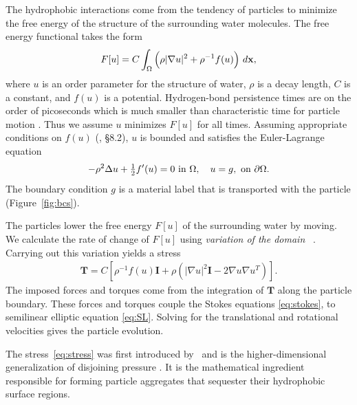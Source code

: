 The hydrophobic interactions come from the tendency of particles to
minimize the free energy of the structure of the surrounding water
molecules. The free energy functional takes the form 
\begin{align*}
\label{eq:free_energy}
  F[u] = C \int_{\Omega} \left(\rho |\nabla u|^2 + \rho^{-1} f(u)\right)
  \,d\mathbf{x},
\end{align*}
where $u$ is an order parameter for the structure of water, $\rho$ is a
decay length, $C$ is a constant, and $f(u)$ is a potential.
Hydrogen-bond persistence times are on the order of picoseconds
which is much smaller than characteristic time for 
particle motion \cite{MaGa13}.
Thus we assume $u$ minimizes $F[u]$ for all times.
Assuming appropriate conditions on $f(u)$ (\cite{evans10}, \S 8.2),
$u$ is bounded and satisfies the Euler-Lagrange equation
\begin{equation}
\label{eq:SL}
-\rho^2 \Delta u + \tfrac{1}{2}f'(u) = 0  \text{ in } \Omega,\quad u = g,
\text{ on } \partial\Omega.
\end{equation}
The boundary condition $g$ is a material label that is transported with
the particle (Figure~\ref{fig:bcs}).

The particles lower the free energy $F[u]$ of the surrounding water
by moving. We calculate the rate of change of $F[u]$ using
\emph{variation of the domain} ~\cite{Fu2018_SIAM,Bandle2015, Schiffer1954, Grinfeld2010}.
Carrying out
this variation yields a 
stress  
\begin{align}
  \label{eq:stress}
\mathbf{T}
= C \left[ \rho^{-1} f(u) \mathbf{I}
  + \rho \left(|\nabla u|^2 \mathbf{I} - 2\nabla u \nabla u^T\right)\right].
\end{align}
The imposed forces and torques come from the integration of $\mathbf{T}$
along the particle boundary.
These forces and torques couple the Stokes equations \eqref{eq:stokes},
to semilinear elliptic equation \eqref{eq:SL}.
Solving for the translational and rotational velocities gives the
particle evolution.

The stress~\eqref{eq:stress} was first
introduced by~\cite{Fu2018_SIAM} and is the higher-dimensional
generalization of disjoining pressure \cite{MaRa76, ErLjCl89, KoNa15,
Nagle17, KUZMIN2005}. It is the mathematical ingredient responsible for
forming particle aggregates that sequester their hydrophobic surface
regions.

